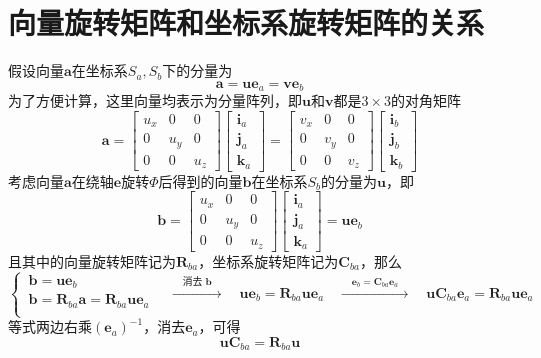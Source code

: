 \section{向量旋转矩阵和坐标系旋转矩阵的关系}
\label{向量旋转矩阵和坐标系旋转矩阵的关系}
假设向量$\bm{a}$在坐标系$S_a, S_b$下的分量为
\begin{equation*}
	\bm{a} = \bm{u} \bm{e}_a = \bm{v} \bm{e}_b
\end{equation*}
为了方便计算，这里向量均表示为分量阵列，即$\bm{u}$和$\bm{v}$都是$3 \times 3$的对角矩阵
\begin{equation*}
	\bm{a} = 
	\begin{bmatrix}
		u_x & 0 & 0 \\
		0 & u_y & 0 \\
		0 & 0 & u_z
	\end{bmatrix}
	\begin{bmatrix}
		\bm{i}_a \\
		\bm{j}_a \\
		\bm{k}_a
	\end{bmatrix}
	=
	\begin{bmatrix}
		v_x & 0 & 0 \\
		0 & v_y & 0 \\
		0 & 0 & v_z
	\end{bmatrix}
	\begin{bmatrix}
		\bm{i}_b \\
		\bm{j}_b \\
		\bm{k}_b
	\end{bmatrix}
\end{equation*}
考虑向量$\bm{a}$在绕轴$\bm{e}$旋转$\varPhi$后得到的向量$\bm{b}$在坐标系$S_b$的分量为$\bm{u}$，即
\begin{equation*}
	\bm{b} = 
	\begin{bmatrix}
		u_x & 0 & 0 \\
		0 & u_y & 0 \\
		0 & 0 & u_z
	\end{bmatrix}
	\begin{bmatrix}
		\bm{i}_a \\
		\bm{j}_a \\
		\bm{k}_a
	\end{bmatrix}
	= \bm{u} \bm{e}_b
\end{equation*}
且其中的向量旋转矩阵记为$\bm{R}_{ba}$，坐标系旋转矩阵记为$\bm{C}_{ba}$，那么
\begin{equation}
	\begin{cases}
		\, \bm{b} = \bm{u} \bm{e}_b \\
		\, \bm{b} = \bm{R}_{ba} \bm{a} = \bm{R}_{ba} \bm{u} \bm{e}_a \\
	\end{cases}
	\quad
	\xrightarrow{\textstyle \quad \mbox{消去}\,\, \bm{b} \quad }
	\quad
	\bm{u} \bm{e}_b = \bm{R}_{ba} \bm{u} \bm{e}_a
	\quad
	\xrightarrow{\textstyle \quad \bm{e}_b  = \bm{C}_{ba} \bm{e}_a \quad }
	\quad
	\bm{u} \bm{C}_{ba} \bm{e}_a = \bm{R}_{ba} \bm{u} \bm{e}_a
\end{equation}
等式两边右乘$(\bm{e}_a)^{-1}$，消去$\bm{e}_a$，可得
\begin{equation}
	\bm{u} \bm{C}_{ba} = \bm{R}_{ba} \bm{u}
\end{equation}




